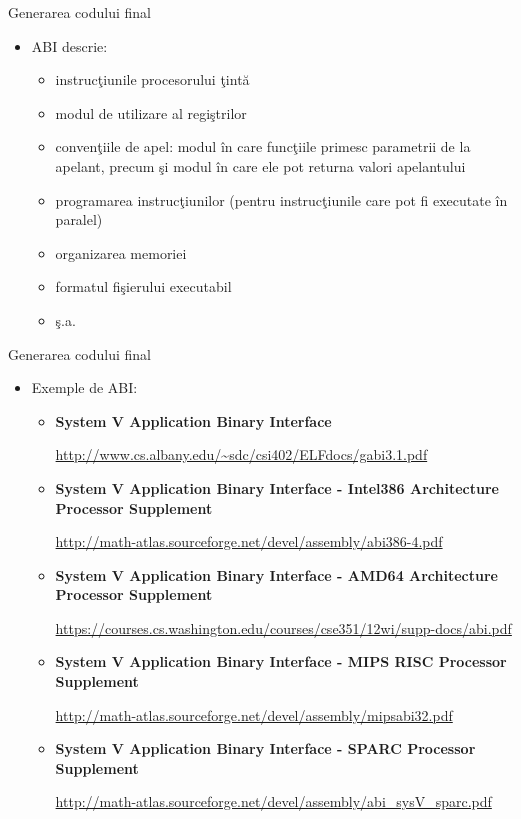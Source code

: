 \documentclass[pdf]{beamer}
\begin{document}
\begin{frame}{Generarea codului final}
\begin{itemize}
\item
ABI descrie:
\begin{itemize}
\item
instrucţiunile procesorului ţintă
\item
modul de utilizare al regiştrilor
\item
convenţiile de apel: modul în care funcţiile primesc parametrii de la apelant, precum şi modul în care ele pot returna valori apelantului
\item
programarea instrucţiunilor (pentru instrucţiunile care pot fi executate în paralel)
\item
organizarea memoriei
\item
formatul fişierului executabil
\item
ş.a.
\end{itemize}

\end{itemize}
\end{frame}



\begin{frame}{Generarea codului final}
\begin{itemize}
\item
Exemple de ABI:
\begin{itemize}
\item
\textbf{System V Application Binary Interface}

\url{http://www.cs.albany.edu/~sdc/csi402/ELFdocs/gabi3.1.pdf}

\item
\textbf{System V Application Binary Interface - Intel386 Architecture Processor Supplement} 

\url{http://math-atlas.sourceforge.net/devel/assembly/abi386-4.pdf}

\item
\textbf{System V Application Binary Interface - AMD64 Architecture Processor Supplement} 

\url{https://courses.cs.washington.edu/courses/cse351/12wi/supp-docs/abi.pdf}

\item
\textbf{System V Application Binary Interface - MIPS RISC Processor Supplement} 

\url{http://math-atlas.sourceforge.net/devel/assembly/mipsabi32.pdf}

\item
\textbf{System V Application Binary Interface - SPARC Processor Supplement} 

\url{http://math-atlas.sourceforge.net/devel/assembly/abi_sysV_sparc.pdf}

\end{itemize}

\end{itemize}
\end{frame}
\end{document}
